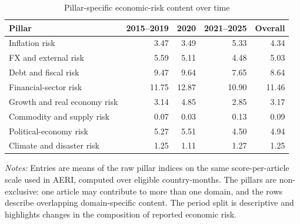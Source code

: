 \begin{table}[htbp]\centering\small\singlespacing
\caption{Pillar-specific economic-risk content over time}\label{tab:pillar_profile}
\setlength{\tabcolsep}{4pt}
\begin{tabular}{lrrrr}\toprule
Pillar & 2015--2019 & 2020 & 2021--2025 & Overall\\\midrule
Inflation risk & 3.47 & 3.49 & 5.33 & 4.34\\
FX and external risk & 5.59 & 5.11 & 4.48 & 5.03\\
Debt and fiscal risk & 9.47 & 9.64 & 7.65 & 8.64\\
Financial-sector risk & 11.75 & 12.87 & 10.90 & 11.46\\
Growth and real economy risk & 3.14 & 4.85 & 2.85 & 3.17\\
Commodity and supply risk & 0.07 & 0.03 & 0.13 & 0.09\\
Political-economy risk & 5.27 & 5.51 & 4.50 & 4.94\\
Climate and disaster risk & 1.25 & 1.11 & 1.27 & 1.25\\
\bottomrule\end{tabular}
\par\medskip\raggedright\footnotesize\textit{Notes:} Entries are means of the raw pillar indices on the same score-per-article scale used in AERI, computed over eligible country-months. The pillars are non-exclusive: one article may contribute to more than one domain, and the rows describe overlapping domain-specific content. The period split is descriptive and highlights changes in the composition of reported economic risk.
\end{table}